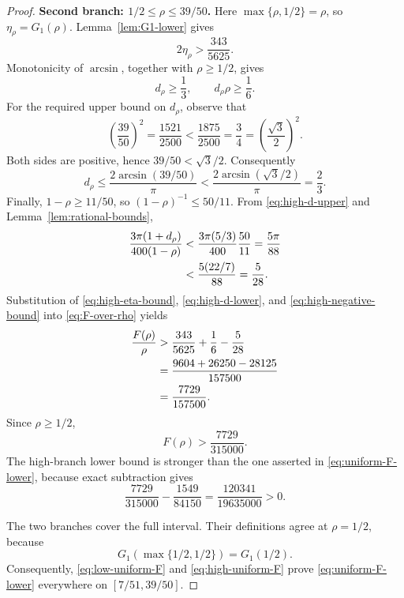 \documentclass[11pt]{article}
\begin{document}
\begin{proof}
\medskip
\noindent
\textbf{Second branch: \(1/2\leq\rho\leq39/50\).}
Here \(\max\{\rho,1/2\}=\rho\), so
\(\eta_\rho=G_1(\rho)\). Lemma~\ref{lem:G1-lower} gives
\begin{equation}
 2\eta_\rho>\frac{343}{5625}.
 \label{eq:high-eta-bound}
\end{equation}
Monotonicity of \(\arcsin\), together with \(\rho\geq1/2\), gives
\begin{equation}
 d_\rho\geq\frac13,
 \qquad
 d_\rho\rho\geq\frac16.
 \label{eq:high-d-lower}
\end{equation}
For the required upper bound on \(d_\rho\), observe that
\[
 \left(\frac{39}{50}\right)^2
 =\frac{1521}{2500}
 <\frac{1875}{2500}=\frac34
 =\left(\frac{\sqrt3}{2}\right)^2.
\]
Both sides are positive, hence \(39/50<\sqrt3/2\). Consequently
\begin{equation}
 d_\rho
 \leq\frac{2\arcsin(39/50)}{\pi}
 <\frac{2\arcsin(\sqrt3/2)}{\pi}
 =\frac23.
 \label{eq:high-d-upper}
\end{equation}
Finally, \(1-\rho\geq11/50\), so
\((1-\rho)^{-1}\leq50/11\). From
\eqref{eq:high-d-upper} and Lemma~\ref{lem:rational-bounds},
\begin{align}
 \frac{3\pi(1+d_\rho)}{400(1-\rho)}
 &<\frac{3\pi(5/3)}{400}\frac{50}{11}
 =\frac{5\pi}{88}\notag\\
 &<\frac{5(22/7)}{88}
 =\frac5{28}.
 \label{eq:high-negative-bound}
\end{align}
Substitution of \eqref{eq:high-eta-bound},
\eqref{eq:high-d-lower}, and \eqref{eq:high-negative-bound} into
\eqref{eq:F-over-rho} yields
\begin{align}
 \frac{F(\rho)}{\rho}
 &>\frac{343}{5625}+\frac16-\frac5{28}\notag\\
 &=\frac{9604+26250-28125}{157500}\notag\\
 &=\frac{7729}{157500}.
 \label{eq:high-F-over-rho}
\end{align}
Since \(\rho\geq1/2\),
\begin{equation}
 F(\rho)>\frac{7729}{315000}.
 \label{eq:high-uniform-F}
\end{equation}
The high-branch lower bound is stronger than the one asserted in
\eqref{eq:uniform-F-lower}, because exact subtraction gives
\[
 \frac{7729}{315000}-\frac{1549}{84150}
 =\frac{120341}{19635000}>0.
\]

The two branches cover the full interval. Their definitions agree at
\(\rho=1/2\), because
\[
 G_1\!\left(\max\{1/2,1/2\}\right)=G_1(1/2).
\]
Consequently, \eqref{eq:low-uniform-F} and
\eqref{eq:high-uniform-F} prove \eqref{eq:uniform-F-lower} everywhere
on \([7/51,39/50]\).
\end{proof}
\end{document}
